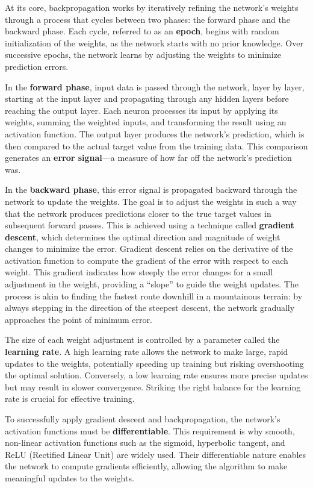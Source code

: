 \documentclass[
]{book}
\theoremstyle{definition}
\theoremstyle{definition}
\theoremstyle{definition}
\theoremstyle{definition}
\theoremstyle{remark}
\begin{document}
At its core, backpropagation works by iteratively refining the network's weights through a process that cycles between two phases: the forward phase and the backward phase. Each cycle, referred to as an \textbf{epoch}, begins with random initialization of the weights, as the network starts with no prior knowledge. Over successive epochs, the network learns by adjusting the weights to minimize prediction errors.

In the \textbf{forward phase}, input data is passed through the network, layer by layer, starting at the input layer and propagating through any hidden layers before reaching the output layer. Each neuron processes its input by applying its weights, summing the weighted inputs, and transforming the result using an activation function. The output layer produces the network's prediction, which is then compared to the actual target value from the training data. This comparison generates an \textbf{error signal}---a measure of how far off the network's prediction was.

In the \textbf{backward phase}, this error signal is propagated backward through the network to update the weights. The goal is to adjust the weights in such a way that the network produces predictions closer to the true target values in subsequent forward passes. This is achieved using a technique called \textbf{gradient descent}, which determines the optimal direction and magnitude of weight changes to minimize the error. Gradient descent relies on the derivative of the activation function to compute the gradient of the error with respect to each weight. This gradient indicates how steeply the error changes for a small adjustment in the weight, providing a ``slope'' to guide the weight updates. The process is akin to finding the fastest route downhill in a mountainous terrain: by always stepping in the direction of the steepest descent, the network gradually approaches the point of minimum error.

The size of each weight adjustment is controlled by a parameter called the \textbf{learning rate}. A high learning rate allows the network to make large, rapid updates to the weights, potentially speeding up training but risking overshooting the optimal solution. Conversely, a low learning rate ensures more precise updates but may result in slower convergence. Striking the right balance for the learning rate is crucial for effective training.

To successfully apply gradient descent and backpropagation, the network's activation functions must be \textbf{differentiable}. This requirement is why smooth, non-linear activation functions such as the sigmoid, hyperbolic tangent, and ReLU (Rectified Linear Unit) are widely used. Their differentiable nature enables the network to compute gradients efficiently, allowing the algorithm to make meaningful updates to the weights.
\end{document}
